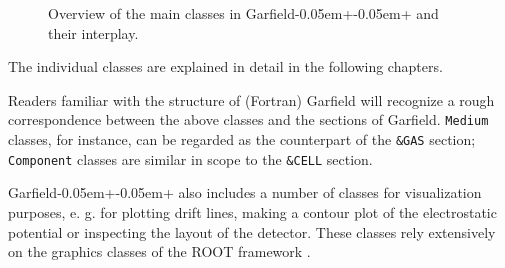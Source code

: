 \begin{figure}
{
  }
  \caption{Overview of the main classes in 
           Garfield\kern-0.05em+\kern-0.05em+ and their interplay.}
  \label{Fig:OverviewClasses}
\end{figure}

The individual classes are explained in detail in the following chapters. 

Readers familiar with the structure 
of (Fortran) Garfield \cite{GarfieldFortran} will recognize a 
rough correspondence between 
the above classes and the sections of Garfield. 
\texttt{Medium} classes, for instance, can be regarded as the counterpart 
of the \texttt{\&GAS} section; 
\texttt{Component} classes are similar in 
scope to the \texttt{\&CELL} section.  
 
Garfield\kern-0.05em+\kern-0.05em+ also includes a number of classes for visualization purposes, 
e. g. for plotting drift lines, making a contour plot of the electrostatic 
potential or inspecting the layout of the detector.   
These classes rely extensively on the graphics classes of the 
ROOT framework \cite{ROOT}.

